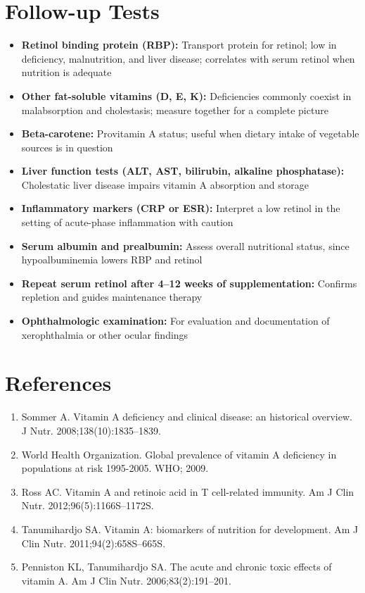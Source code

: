 \section*{Follow-up Tests}
\begin{itemize}
  \item \textbf{Retinol binding protein (RBP):} Transport protein for retinol; low in deficiency, malnutrition, and liver disease; correlates with serum retinol when nutrition is adequate
  \item \textbf{Other fat-soluble vitamins (D, E, K):} Deficiencies commonly coexist in malabsorption and cholestasis; measure together for a complete picture
  \item \textbf{Beta-carotene:} Provitamin A status; useful when dietary intake of vegetable sources is in question
  \item \textbf{Liver function tests (ALT, AST, bilirubin, alkaline phosphatase):} Cholestatic liver disease impairs vitamin A absorption and storage
  \item \textbf{Inflammatory markers (CRP or ESR):} Interpret a low retinol in the setting of acute-phase inflammation with caution
  \item \textbf{Serum albumin and prealbumin:} Assess overall nutritional status, since hypoalbuminemia lowers RBP and retinol
  \item \textbf{Repeat serum retinol after 4--12 weeks of supplementation:} Confirms repletion and guides maintenance therapy
  \item \textbf{Ophthalmologic examination:} For evaluation and documentation of xerophthalmia or other ocular findings
\end{itemize}

\section*{References}
\begin{enumerate}
  \item Sommer A. Vitamin A deficiency and clinical disease: an historical overview. J Nutr. 2008;138(10):1835--1839.
  \item World Health Organization. Global prevalence of vitamin A deficiency in populations at risk 1995-2005. WHO; 2009.
  \item Ross AC. Vitamin A and retinoic acid in T cell-related immunity. Am J Clin Nutr. 2012;96(5):1166S--1172S.
  \item Tanumihardjo SA. Vitamin A: biomarkers of nutrition for development. Am J Clin Nutr. 2011;94(2):658S--665S.
  \item Penniston KL, Tanumihardjo SA. The acute and chronic toxic effects of vitamin A. Am J Clin Nutr. 2006;83(2):191--201.
\end{enumerate}

\clearpage
